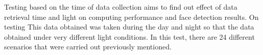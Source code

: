 Testing based on the time of data collection aims to find out
effect of data retrieval time and light on computing performance
and face detection results. On testing
This data obtained was taken during the day and night so that the data obtained
under very different light conditions. In this test, there are 24 different scenarios that were carried out previously mentioned.

\begin{table}[pt]
  \caption{Table of detection results based on time (Daylight)}
  \centering
\end{table}
